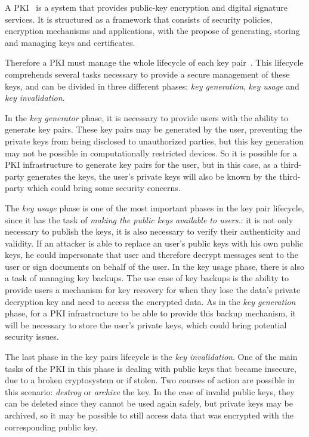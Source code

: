 A \acl{PKI}~\cite{choudhury2002public}\cite{Entrust2000} is a system that provides public-key encryption and digital signature services. It is structured as a framework that consists of security policies, encryption mechanisms and applications, with the propose of generating, storing and managing keys and certificates.

Therefore a \ac{PKI} must manage the whole lifecycle of each key pair~\cite{Buchmann2013}. This lifecycle comprehends several tasks necessary to provide a secure management of these keys, and can be divided in three different phases: \textit{key generation}, \textit{key usage} and \textit{key invalidation}.

In the \textit{key generator} phase, it is necessary to provide users with the ability to generate key pairs. These key pairs may be generated by the user, preventing the private keys from being disclosed to unauthorized parties, but this key generation may not be possible in computationally restricted devices. So it is possible for a \ac{PKI} infrastructure to generate key pairs for the user, but in this case, as a third-party generates the keys, the user's private keys will also be known by the third-party which could bring some security concerns.

The \textit{key usage} phase is one of the most important phases in the key pair lifecycle, since it has the task of \textit{making the public keys available to users.}: it is not only necessary to publish the keys, it is also necessary to verify their authenticity and validity. If an attacker is able to replace an user's public keys with his own public keys, he could impersonate that user and therefore decrypt messages sent to the user or sign documents on behalf of the user. In the key usage phase, there is also a task of managing key backups. The use case of key backups is the ability to provide users a mechanism for key recovery for when they lose the data's private decryption key and need to access the encrypted data. As in the \textit{key generation} phase, for a \ac{PKI} infrastructure to be able to provide this backup mechanism, it will be necessary to store the user's private keys, which could bring potential security issues.

The last phase in the key pairs lifecycle is the \textit{key invalidation}. One of the main tasks of the \ac{PKI} in this phase is dealing with public keys that became insecure, due to a broken cryptosystem or if stolen. Two courses of action are possible in this scenario: \textit{destroy} or \textit{archive} the key. In the case of invalid public keys, they can be deleted since they cannot be used again safely, but private keys may be archived, so it may be possible to still access data that was encrypted with the corresponding public key.

